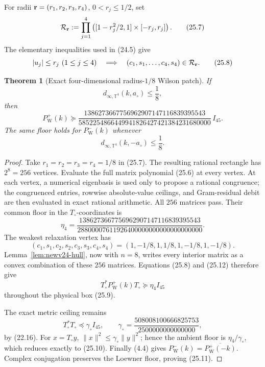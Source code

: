 \documentclass[11pt,oneside]{article}
\newtheorem{theorem}{Theorem}[section]
\theoremstyle{definition}
\theoremstyle{remark}
\begin{document}
For radii \({\bf r}=(r_1,r_2,r_3,r_4)\), \(0<r_j\le1/2\), set
\[
 {\cal R}_{\bf r}:=
 \prod_{j=1}^4
 \left([1-r_j^2/2,1]\times[-r_j,r_j]\right).             \tag{25.7}
\]
The elementary inequalities used in (24.5) give
\[
 |u_j|\le r_j\ (1\le j\le4)
 \quad\Longrightarrow\quad
 (c_1,s_1,\ldots,c_4,s_4)\in{\cal R}_{\bf r}.            \tag{25.8}
\]

\begin{theorem}[Exact four-dimensional radius-\(1/8\) Wilson patch]
\label{thm:newv25-four-hull}
If
\[
 d_{\infty,\mathbb T^4}(k,a_\circ)\le\frac18,            \tag{25.9}
\]
then
\[
 P_{\mathrm W}^+(k)\succeq
 \frac{
1386273667756962907147116839395543}
{5852254866449941826427421384231680000}\,I_{45}.        \tag{25.10}
\]
The same floor holds for \(P_{\mathrm W}^-(k)\) whenever
\[
 d_{\infty,\mathbb T^4}(k,-a_\circ)\le\frac18.           \tag{25.11}
\]
\end{theorem}

\begin{proof}
Take \(r_1=r_2=r_3=r_4=1/8\) in (25.7).  The resulting rational
rectangle has \(2^8=256\) vertices.  Evaluate the full matrix
polynomial (25.6) at every vertex.  At each vertex, a numerical
eigenbasis is used only to propose a rational congruence; the
congruenced entries, rowwise absolute-value ceilings, and
Gram-residual debit are then evaluated in exact rational arithmetic.
All \(256\) matrices pass.  Their common floor in the
\(T_\circ\)-coordinates is
\[
 \eta_4=
 \frac{
1386273667756962907147116839395543}
{28800007611926400000000000000000000}.                  \tag{25.12}
\]
The weakest relaxation vertex has
\[
 (c_1,s_1,c_2,s_2,c_3,s_3,c_4,s_4)
 =(1,-1/8,1,1/8,1,-1/8,1,-1/8).                        \tag{25.13}
\]
Lemma~\ref{lem:newv24-hull}, now with \(n=8\), writes every
interior matrix as a convex combination of these \(256\) matrices.
Equations (25.8) and (25.12) therefore give
\[
 T_\circ^*P_{\mathrm W}^+(k)T_\circ\succeq\eta_4I_{45}
\]
throughout the physical box (25.9).

The exact metric ceiling remains
\[
 T_\circ^*T_\circ\preceq
 \gamma_\circ I_{45},\qquad
 \gamma_\circ=
 \frac{508008100666825753}{2500000000000000},           \tag{25.14}
\]
by (22.16).  For \(x=T_\circ y\),
\(\|x\|^2\le\gamma_\circ\|y\|^2\); hence the ambient floor is
\(\eta_4/\gamma_\circ\), which reduces exactly to (25.10).
Finally (4.4) gives
\(P_{\mathrm W}^-(k)=\overline{P_{\mathrm W}^+(-k)}\).
Complex conjugation preserves the Loewner floor, proving (25.11).
\end{proof}
\end{document}
